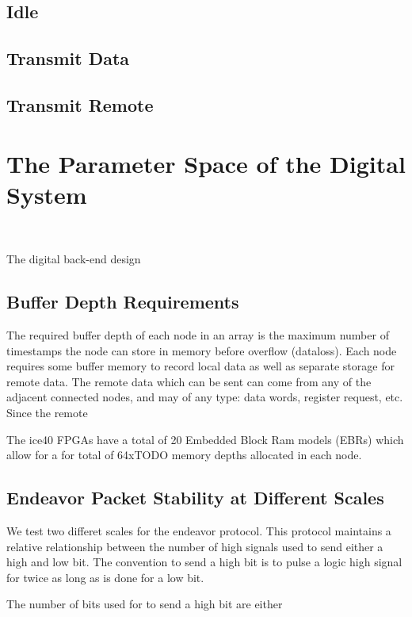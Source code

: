 \subsection{Idle}

\subsection{Transmit Data}

\subsection{Transmit Remote}


\section{The Parameter Space of the Digital System}~\label{sec:parameter_space}

The digital back-end design

\subsection{Buffer Depth Requirements}

The required buffer depth of each node in an array is the maximum number of timestamps the node can store in memory before overflow (dataloss).
Each node requires some buffer memory to record local data as well as separate storage for remote data.
The remote data which can be sent can come from any of the adjacent connected nodes, and may of any type: data words, register request, etc.
Since the remote

The ice40 FPGAs have a total of 20 Embedded Block Ram models (EBRs) which allow for a for total of 64xTODO memory depths allocated in each node.

\subsection{Endeavor Packet Stability at Different Scales}

We test two differet scales for the endeavor protocol.
This protocol maintains a relative relationship between the number of high signals used to send either a high and low bit.
The convention to send a high bit is to pulse a logic high signal for twice as long as is done for a low bit.

The number of bits used for to send a high bit are either

